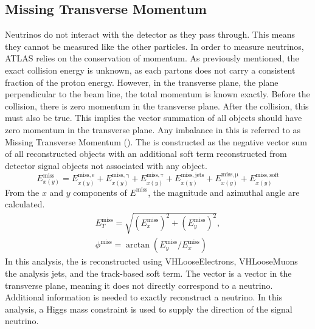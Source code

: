 \subsection{Missing Transverse Momentum}
Neutrinos do not interact with the detector as they pass through. This means they cannot be measured like the other particles. In order to measure neutrinos, ATLAS relies on the conservation of momentum. As previously mentioned, the exact collision energy is unknown, as each partons does not carry a consistent fraction of the proton energy. However, in the transverse plane, the plane perpendicular to the beam line, the total momentum is known exactly. Before the collision, there is zero momentum in the transverse plane. After the collision, this must also be true. This implies the vector summation of all objects should have zero momentum in the transverse plane. Any imbalance in this is referred to as  Missing Transverse Momentum (\met). The \met{} is constructed as the negative vector sum of all reconstructed objects with an additional soft term reconstructed from detector signal objects not associated with any object\cite{ATL-PHYS-PUB-2015-027}. 
\begin{equation}
E^{\mathrm{miss}}_{x(y)} = E^{\mathrm{miss, e}}_{x(y)}+E^{\mathrm{miss, \gamma}}_{x(y)} + E^{\mathrm{miss, \tau}}_{x(y)} + E^{\mathrm{miss, jets}}_{x(y)} + E^{\mathrm{miss, \mu}}_{x(y)} + E^{\mathrm{miss, soft}}_{x(y)}
\end{equation}
From the $x$ and $y$ components of ${E^{\mathrm{miss}}}$, the magnitude and azimuthal angle  are calculated.
\begin{equation}
\begin{split}
E^{\mathrm{miss}}_{T} = \sqrt{(E^{\mathrm{miss}}_{x})^{2} + (E^{\mathrm{miss}}_{y})^{2}},\\
\phi^{\mathrm{miss}} = \arctan(E^{\mathrm{miss}}_{y}/E^{\mathrm{miss}}_{x})
\end{split}
\end{equation}
In this analysis, the \met is reconstructed using VHLooseElectrons, VHLooseMuons the analysis jets, and the track-based soft term.\newline
\indent The \met{} vector is a vector in the transverse plane, meaning it does not directly correspond to a neutrino. Additional information is needed to exactly reconstruct a neutrino. In this analysis, a Higgs mass constraint is used to supply the direction of the signal neutrino. \newline

